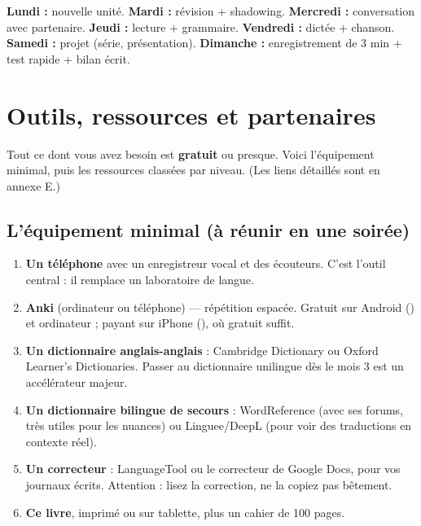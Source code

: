 \begin{memo}
\textbf{Lundi :} nouvelle unité. \textbf{Mardi :} révision + shadowing.
\textbf{Mercredi :} conversation avec partenaire. \textbf{Jeudi :} lecture + grammaire.
\textbf{Vendredi :} dictée + chanson. \textbf{Samedi :} projet (série, présentation).
\textbf{Dimanche :} enregistrement de 3 min + test rapide + bilan écrit.
\end{memo}


\chapter{Outils, ressources et partenaires}

Tout ce dont vous avez besoin est \textbf{gratuit} ou presque. Voici l'équipement minimal,
puis les ressources classées par niveau. (Les liens détaillés sont en annexe E.)

\section{L'équipement minimal (à réunir en une soirée)}
\begin{enumerate}
  \item \textbf{Un téléphone} avec un enregistreur vocal et des écouteurs. C'est l'outil
  central : il remplace un laboratoire de langue.
  \item \textbf{Anki} (ordinateur ou téléphone) --- répétition espacée. Gratuit sur Android
  () et ordinateur ; payant sur iPhone (), où 
  gratuit suffit.
  \item \textbf{Un dictionnaire anglais-anglais} : Cambridge Dictionary ou Oxford Learner's
  Dictionaries. Passer au dictionnaire unilingue dès le mois 3 est un accélérateur majeur.
  \item \textbf{Un dictionnaire bilingue de secours} : WordReference (avec ses forums, très
  utiles pour les nuances) ou Linguee/DeepL (pour voir des traductions en contexte réel).
  \item \textbf{Un correcteur} : LanguageTool ou le correcteur de Google Docs, pour vos
  journaux écrits. Attention : lisez la correction, ne la copiez pas bêtement.
  \item \textbf{Ce livre}, imprimé ou sur tablette, plus un cahier de 100 pages.
\end{enumerate}

